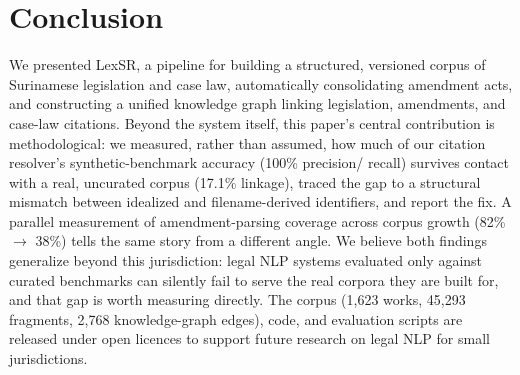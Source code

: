\documentclass{IOS-Book-Article}
\begin{document}
\section{Conclusion}
\label{sec:conclusion}

We presented LexSR, a pipeline for building a structured, versioned corpus of Surinamese
legislation and case law, automatically consolidating amendment acts, and constructing a
unified knowledge graph linking legislation, amendments, and case-law citations. Beyond the
system itself, this paper's central contribution is methodological: we measured, rather than
assumed, how much of our citation resolver's synthetic-benchmark accuracy (100\% precision/
recall) survives contact with a real, uncurated corpus (17.1\% linkage), traced the gap to a
structural mismatch between idealized and filename-derived identifiers, and report the fix.
A parallel measurement of amendment-parsing coverage across corpus growth (82\% $\rightarrow$ 38\%) tells
the same story from a different angle. We believe both findings generalize beyond this
jurisdiction: legal NLP systems evaluated only against curated benchmarks can silently fail
to serve the real corpora they are built for, and that gap is worth measuring directly. The
corpus (1,623 works, 45,293 fragments, 2,768 knowledge-graph edges), code, and evaluation
scripts are released under open licences to support future research on legal NLP for small
jurisdictions.
\end{document}
